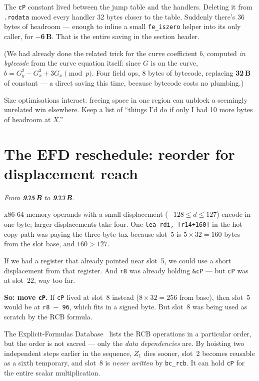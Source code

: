 \documentclass[11pt,a4paper]{article}
\newcommand{\bytes}[1]{\textcolor{blue!60!black}{\textbf{#1\,B}}}
\newcommand{\saved}[1]{\textcolor{green!50!black}{\textbf{$-$#1\,B}}}
\begin{document}
The \texttt{cP} constant lived between the jump table and the
handlers. Deleting it from \texttt{.rodata} moved every handler 32
bytes closer to the table. Suddenly there's 36 bytes of headroom ---
enough to inline a small \texttt{fe\_iszero} helper into its only
caller, for \saved{6}. That is the entire saving in the section
header.

(We had already done the related trick for the curve coefficient $b$,
computed \emph{in bytecode} from the curve equation itself: since $G$
is on the curve, $b = G_y^2 - G_x^3 + 3 G_x \pmod p$. Four field ops,
8 bytes of bytecode, replacing \bytes{32} of constant --- a direct
saving this time, because bytecode costs no plumbing.)

Size optimisations interact: freeing space in one region can
unblock a seemingly unrelated win elsewhere. Keep a list
of ``things I'd do if only I had 10 more bytes of headroom at $X$.''

\section{The EFD reschedule: reorder for displacement reach}
\label{sec:efd}

\noindent\emph{From \bytes{935} to \bytes{933}.}

x86-64 memory operands with a small displacement ($-128 \le d \le
127$) encode in one byte; larger displacements take four. One
\texttt{lea rdi, [r14+160]} in the hot copy path was paying the
three-byte tax because slot~5 is $5 \times 32 = 160$ bytes from the
slot base, and $160 > 127$.

If we had a register that already pointed near slot~5, we could
use a short displacement from that register. And \texttt{r8} was
already holding \texttt{\&cP} --- but \texttt{cP} was at slot~22, way
too far.

\textbf{So: move \texttt{cP}.} If \texttt{cP} lived at slot~8 instead
($8 \times 32 = 256$ from base), then slot~5 would be at
\texttt{r8 $-$ 96}, which fits in a signed byte. But slot~8 was being
used as scratch by the RCB formula.

The Explicit-Formulas Database~\cite{efd} lists the RCB operations in
a particular order, but the order is not sacred --- only the
\emph{data dependencies} are. By hoisting two independent steps
earlier in the sequence, $Z_1$ dies sooner, slot~2 becomes reusable
as a sixth temporary, and slot~8 is \emph{never written} by
\texttt{bc\_rcb}. It can hold \texttt{cP} for the entire scalar
multiplication.
\end{document}
